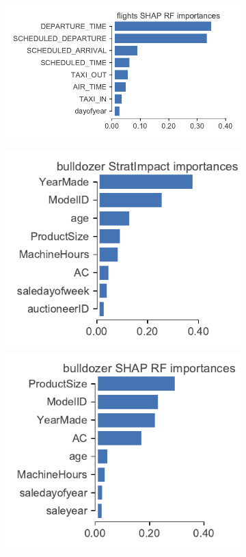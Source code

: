 \documentclass[11pt]{article}
\begin{document}
\begin{figure}
\begin{subfigure}{1\textwidth}
\includegraphics[scale=0.5]{images/flights-features-shap-rf.pdf}
\vspace{-2mm}\vspace{3mm}
\end{subfigure}
\hfill
\begin{subfigure}{1\textwidth}
    \centering
\includegraphics[scale=0.5]{images/bulldozer-features.pdf}
\includegraphics[scale=0.5]{images/bulldozer-features-shap-rf.pdf}

\end{subfigure}
\end{figure}
\end{document}

